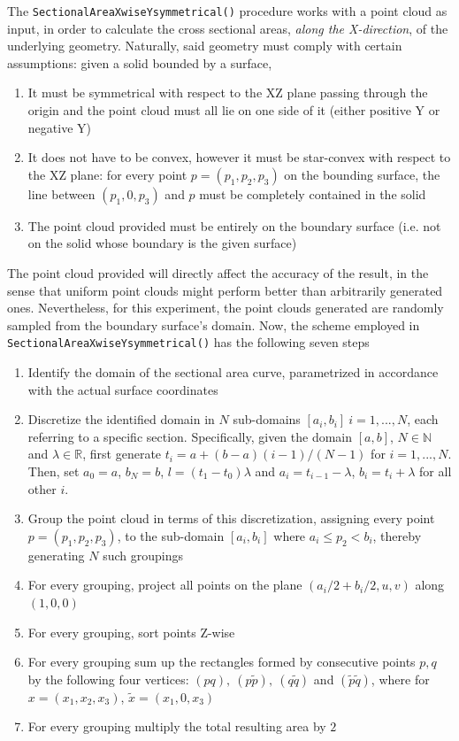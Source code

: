\documentclass{report}
\begin{document}
\newpar The \texttt{SectionalAreaXwiseYsymmetrical()} procedure works with 
a point cloud as input, in order to calculate the cross sectional areas, {\it along the 
X-direction}, of the underlying geometry. Naturally, said geometry must comply 
with certain assumptions: given a solid bounded by a surface,
\begin{enumerate}
    \item It must be symmetrical with respect to the XZ plane passing through the origin
    and the point cloud must all lie on one side of it (either positive Y or negative Y)
    \item It does not have to be convex, however it must be star-convex with respect to 
    the XZ plane: for every point $p = (p_1,p_2,p_3)$ on the bounding surface, the line between
    $(p_1,0,p_3)$ and $p$ must be completely contained in the solid
    \item The point cloud provided must be entirely on the boundary surface (i.e. not on the 
    solid whose boundary is the given surface)
\end{enumerate}
The point cloud provided will directly affect the accuracy of the result, in the sense that uniform point 
clouds might perform better than arbitrarily generated ones. Nevertheless, for this 
experiment, the point clouds generated are randomly sampled from the 
boundary surface's domain. 
\newpar Now, the scheme employed in \texttt{SectionalAreaXwiseYsymmetrical()} has the following
seven steps
\begin{enumerate}
    \item Identify the domain of the sectional area curve, parametrized in accordance with 
    the actual surface coordinates
    \item Discretize the identified domain in $N$ sub-domains $[a_i,b_i]\ i=1,...,N$, each referring to a specific
    section. Specifically, given the domain $[a,b]$, $N\in\mathbb{N}$ and $\lambda\in\mathbb{R}$, first generate 
    $t_i = a + (b-a)(i-1)/(N-1)$ for $i=1,...,N$. Then, set $a_0 = a$, $b_N = b$, $l = (t_1-t_0)\lambda$  and $a_i = t_{i-1} - \lambda$,
    $b_i = t_i + \lambda$ for all other $i$.
    \item Group the point cloud in terms of this discretization, assigning every point $p=(p_1,p_2,p_3)$, to the sub-domain 
    $[a_i,b_i]$ where $a_i \le p_2 < b_i$, thereby generating $N$ such groupings
    \item For every grouping, project all points on the plane $(a_i/2+b_i/2, u, v)$ along $(1,0,0)$
    \item For every grouping, sort points Z-wise
    \item For every grouping sum up the rectangles formed by consecutive points $p, q$ by the following 
    four vertices: $(pq),\ (p\tilde{p}),\ (q\tilde{q})$ and $(\tilde{p}\tilde{q})$, where for $x=(x_1,x_2,x_3)$,
    $\tilde{x}=(x_1,0,x_3)$
    \item For every grouping multiply the total resulting area by $2$
\end{enumerate}
\end{document}
